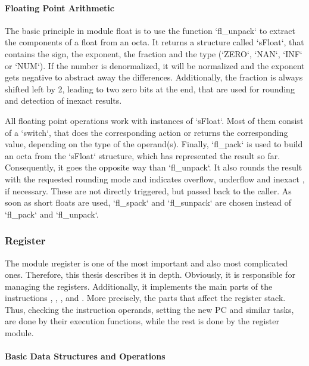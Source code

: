 \paragraph{Floating Point Arithmetic}

The basic principle in module float is to use the function `fl_unpack` to extract the components of a float from an octa. It returns a structure called `sFloat`, that contains the sign, the exponent, the fraction and the type (`ZERO`, `NAN`, `INF` or `NUM`). If the number is denormalized, it will be normalized and the exponent gets negative to abstract away the differences. Additionally, the fraction is always shifted left by 2, leading to two zero bits at the end, that are used for rounding and detection of inexact results.

All floating point operations work with instances of `sFloat`. Most of them consist of a `switch`, that does the corresponding action or returns the corresponding value, depending on the type of the operand(s). Finally, `fl_pack` is used to build an octa from the `sFloat` structure, which has represented the result so far. Consequently, it goes the opposite way than `fl_unpack`. It also rounds the result with the requested rounding mode and indicates overflow, underflow and inexact , if necessary. These are not directly triggered, but passed back to the caller. As soon as short floats are used, `fl_spack` and `fl_sunpack` are chosen instead of `fl_pack` and `fl_unpack`.

\subsubsection{Register}

The module \i{register} is one of the most important and also most complicated ones. Therefore, this thesis describes it in depth. Obviously, it is responsible for managing the registers. Additionally, it implements the main parts of the instructions , , ,  and . More precisely, the parts that affect the register stack. Thus, checking the instruction operands, setting the new \gls{PC} and similar tasks, are done by their execution functions, while the rest is done by the register module.

\paragraph{Basic Data Structures and Operations}


